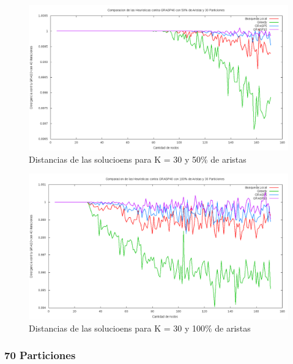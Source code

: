 \begin{figure}[H]
\begin{center}
\includegraphics[scale=0.4]{finales/muchosComparacionesCon30Particiones50Aristas.png}
\caption{Distancias de las solucioens para K = 30 y 50\% de aristas}
\end{center}
\end{figure}

\begin{figure}[H]
\begin{center}
\includegraphics[scale=0.4]{finales/muchosComparacionesCon30Particiones100Aristas.png}
\caption{Distancias de las solucioens para K = 30 y 100\% de aristas}
\end{center}
\end{figure}

\subsubsection{70 Particiones}

